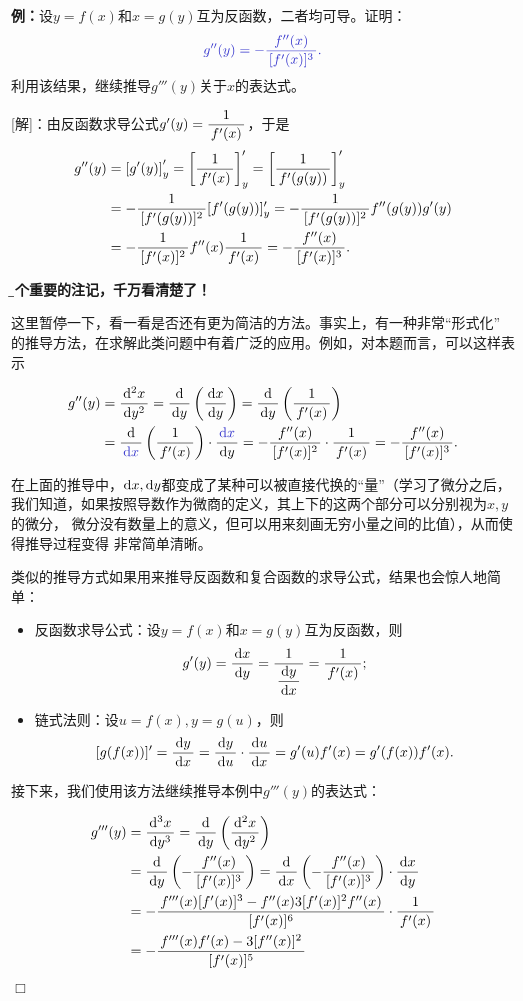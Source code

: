 {\bf 例：}设$y=f(x)$和$x=g(y)$互为反函数，二者均可导。证明：
$$\b g''(y)=-\df{f''(x)}{[f'(x)]^3}.$$
利用该结果，继续推导$g'''(y)$关于$x$的表达式。

[解]：由反函数求导公式$g'(y)=\df1{f'(x)}$，于是
\begin{align*}
	g''(y)&=\left[g'(y)\right]'_y=\left[\df1{f'(x)}\right]'_y
	=\left[\df1{f'(g(y))}\right]'_y\\
	&=-\df{1}{[f'(g(y))]^2}[f'(g(y))]'_y
	=-\df{1}{[f'(g(y))]^2}f''(g(y))g'(y)\\
	&=-\df{1}{[f'(x)]^2}f''(x)\df1{f'(x)}
	=-\df{f''(x)}{[f'(x)]^3}.
\end{align*}
\begin{shaded}
	{\bf\b 一个重要的注记，千万看清楚了！}
	
	这里暂停一下，看一看是否还有更为简洁的方法。事实上，有一种非常“形式化”
	的推导方法，在求解此类问题中有着广泛的应用。例如，对本题而言，可以这样表示
	\begin{tcolorbox}[colframe=red!80!black]
		\begin{align*}
			g''(y)&=\df{\d^2x}{\d y^2}
			=\df{\d }{\d y}\left(\df{\d x}{\d y}\right)
			=\df{\d }{\d y}\left(\df1{f'(x)}\right)\\
			&=\df{\d }{\b\d x}\left(\df1{f'(x)}\right)\cdot\df{\b\d x}{\d y}
			=-\df{f''(x)}{[f'(x)]^2}\cdot\df1{f'(x)}
			=-\df{f''(x)}{[f'(x)]^3}.
		\end{align*}
	\end{tcolorbox}
	在上面的推导中，$\d x,\d y$都变成了某种可以被直接代换的“量”（学习了微分之后，
	我们知道，如果按照导数作为微商的定义，其上下的这两个部分可以分别视为$x,y$的微分，
	微分没有数量上的意义，但可以用来刻画无穷小量之间的比值），从而使得推导过程变得
	非常简单清晰。
	
	类似的推导方式如果用来推导反函数和复合函数的求导公式，结果也会惊人地简单：
	\begin{itemize}
	  \item 反函数求导公式：设$y=f(x)$和$x=g(y)$互为反函数，则
	  $$g'(y)=\df{\d x}{\d y}=\df1{\df{\d y}{\d x}}=\df1{f'(x)};$$
	  \item 链式法则：设$u=f(x),y=g(u)$，则
	  $$[g(f(x))]'=\df{\d y}{\d x}
	  =\df{\d y}{\d u}\cdot \df{\d u}{\d x}
	  =g'(u)f'(x)=g'(f(x))f'(x).$$
	\end{itemize}
	
	接下来，我们使用该方法继续推导本例中$g'''(y)$的表达式：
\end{shaded}

\begin{align*}
	g'''(y)
	&=\df{\d^3 x}{\d y^3}
	=\df{\d }{\d y}\left(\df{\d^2 x}{\d y^2}\right)\\
	&=\df{\d }{\d y}\left(-\df{f''(x)}{[f'(x)]^3}\right)
	=\df{\d }{\d x}\left(-\df{f''(x)}{[f'(x)]^3}\right)
	\cdot\df{\d x}{\d y}\\
	&=-\df{f'''(x)[f'(x)]^3-f''(x)3[f'(x)]^2f''(x)}{[f'(x)]^6}
	\cdot\df1{f'(x)}\\
	&=-\df{f'''(x)f'(x)-3[f''(x)]^2}{[f'(x)]^5}
\end{align*}
\hfill$\Box$


